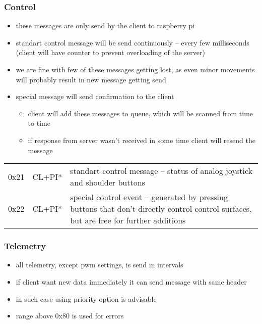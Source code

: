 \documentclass[a4paper,12pt]{report}
\begin{document}
\subsubsection{Control}

\begin{itemize}
  \item these messages are only send by the client to raspberry pi
  \item standart control message will be send continuously -- every few milliseconds (client will have counter to prevent overloading of the server)
  \item we are fine with few of these messages getting lost, as even minor movements will probably result in new message getting send
  \item special message will send confirmation to the client
    \begin{itemize}
      \item client will add these messages to queue, which will be scanned from time to time
      \item if response from server wasn't received in some time client will resend the message
    \end{itemize}

\end{itemize}

\begin{center}
  \begin{longtable}{| m{1cm} | m{1.5cm} | m{13cm} | }
    \hline
    0x21 & CL+PI* & standart control message -- status of analog joystick and shoulder buttons                                                              \\
    0x22 & CL+PI* & special control event -- generated by pressing buttons that don't directly control control surfaces, but are free for further additions \\
    \hline
  \end{longtable}
\end{center}

\subsubsection{Telemetry}

\begin{itemize}
  \item all telemetry, except pwm settings,  is send in intervals
  \item if client want new data immediately it can send message with same header
  \item in such case using priority option is advisable
  \item range above 0x80 is used for errors
\end{itemize}
\end{document}

